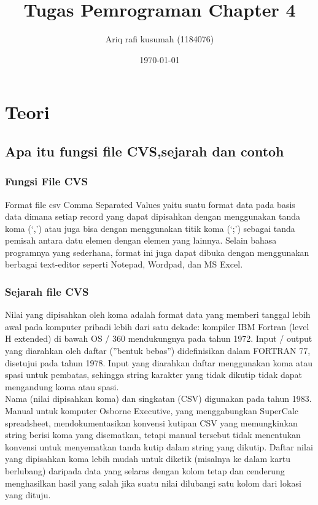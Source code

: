 \documentclass[12pt, times new roman]{report}
\title{Tugas Pemrograman Chapter 4}
\author{Ariq rafi kusumah (1184076)}
\date{\today}
\begin{document}
\maketitle

\chapter{Teori}

\section{Apa itu fungsi file CVS,sejarah dan contoh}

\subsection{Fungsi File CVS}
\hspace{0.5cm}Format file csv Comma Separated Values yaitu suatu format data pada
basis data dimana setiap record yang dapat dipisahkan dengan menggunakan tanda koma (‘,’) atau juga bisa dengan menggunakan titik koma (‘;’)
sebagai tanda pemisah antara datu elemen dengan elemen yang lainnya.
Selain bahasa programnya yang sederhana, format ini juga dapat dibuka
dengan menggunakan berbagai text-editor seperti Notepad, Wordpad, dan
MS Excel.

\subsection{Sejarah file CVS}

\hspace{0.5cm}Nilai yang dipisahkan oleh koma adalah format data yang memberi tanggal lebih awal pada komputer pribadi lebih dari satu dekade: kompiler
IBM Fortran (level H extended) di bawah OS / 360 mendukungnya pada
tahun 1972. Input / output yang diarahkan oleh daftar (”bentuk bebas”)
didefinisikan dalam FORTRAN 77, disetujui pada tahun 1978. Input yang
diarahkan daftar menggunakan koma atau spasi untuk pembatas, sehingga
string karakter yang tidak dikutip tidak dapat mengandung koma atau
spasi.\\

Nama (nilai dipisahkan koma) dan singkatan (CSV) digunakan pada
tahun 1983. Manual untuk komputer Osborne Executive, yang menggabungkan SuperCalc spreadsheet, mendokumentasikan konvensi kutipan
CSV yang memungkinkan string berisi koma yang disematkan, tetapi manual tersebut tidak menentukan konvensi untuk menyematkan tanda kutip
dalam string yang dikutip. Daftar nilai yang dipisahkan koma lebih mudah untuk diketik (misalnya ke dalam kartu berlubang) daripada data
yang selaras dengan kolom tetap dan cenderung menghasilkan hasil yang
salah jika suatu nilai dilubangi satu kolom dari lokasi yang dituju.\\
\end{document}
